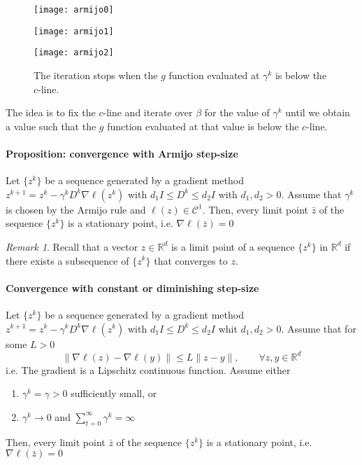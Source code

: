 \documentclass[openany]{book}
\newcommand{\R}{\mathbb{R}}               %
\theoremstyle{definition}
\theoremstyle{remark}
\newtheorem*{remark}{Remark}
\begin{document}
\begin{figure}[ht]
    \centering
    \begin{minipage}{.33\textwidth}
        \centering
        \texttt{[image: armijo0]}
    \end{minipage}%
    \begin{minipage}{.33\textwidth}
        \centering
        \texttt{[image: armijo1]}
    \end{minipage}%
    \begin{minipage}{.33\textwidth}
        \centering
        \texttt{[image: armijo2]}
    \end{minipage}%
    \caption{The iteration stops when the $g$ function evaluated at $\gamma^k$ is below the $c$-line.}
\end{figure}

The idea is to fix the $c$-line and iterate over $\beta$ for the value of $\gamma^k$ until we obtain a value such that the $g$ function evaluated at that value is below the $c$-line.

\paragraph{Proposition: convergence with Armijo step-size}

Let $\{z^k\}$ be a sequence generated by a gradient method $z^{k+1}=z^k-\gamma^kD^k\nabla\ell(z^k)$ with $d_1I\leq D^k \leq d_2I$ with $d_1,d_2>0$. 
Assume that $\gamma^k$ is chosen by the Armijo rule and $\ell(z)\in \mathcal{C}^1$. Then, every limit point $\bar{z}$ of the sequence $\{z^k\}$ is a stationary point, i.e. $\nabla\ell(\bar{z})=0$
\begin{remark}
Recall that a vector $z\in\R^d$ is a limit point of a sequence $\{z^k\}$ in $\R^d$ if there exists a subsequence of $\{z^k\}$ that converges to $z$.
\end{remark}

\paragraph{Convergence with constant or diminishing step-size}

Let $\{z^k\}$ be a sequence generated by a gradient method $z^{k+1}=z^k-\gamma^kD^k\nabla\ell(z^k)$ with $d_1I\leq D^k \leq d_2I$ whit $d_1,d_2>0$. Assume that for some $L>0$ 
\[
    \|\nabla\ell(z)-\nabla\ell(y)\|\leq L\|z-y\|, \qquad \forall z,y\in\R^d
\]
i.e. The gradient is a Lipschitz continuous function.
Assume either
\begin{enumerate}
    \item $\gamma^k=\gamma>0$ sufficiently small, or 
    \item $\gamma^k\to 0$ and $\displaystyle\sum_{t=0}^{\infty}\gamma^k=\infty$
\end{enumerate}
Then, every limit point $\bar{z}$ of the sequence $\{z^k\}$ is a stationary point, i.e. $\nabla\ell(\bar{z})=0$
\end{document}
